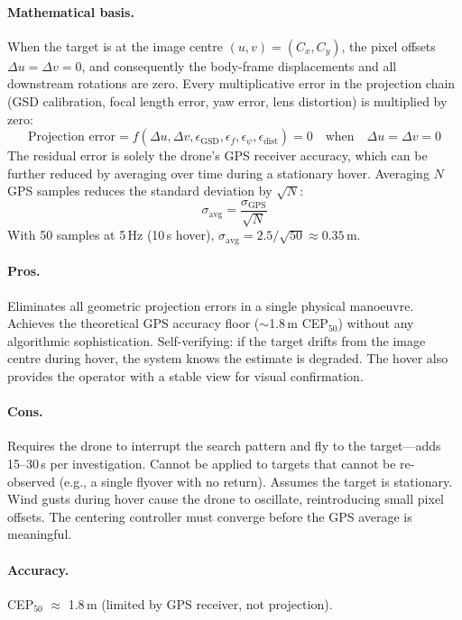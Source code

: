 \paragraph{Mathematical basis.}
When the target is at the image centre $(u, v) = (C_x, C_y)$, the pixel offsets $\Delta u = \Delta v = 0$, and consequently the body-frame displacements and all downstream rotations are zero.  Every multiplicative error in the projection chain (GSD calibration, focal length error, yaw error, lens distortion) is multiplied by zero:
\begin{equation}
  \text{Projection error} = f(\Delta u, \Delta v, \epsilon_\mathrm{GSD}, \epsilon_f, \epsilon_\psi, \epsilon_\mathrm{dist}) = 0 \quad \text{when} \quad \Delta u = \Delta v = 0
\end{equation}
The residual error is solely the drone's GPS receiver accuracy, which can be further reduced by averaging over time during a stationary hover.  Averaging $N$ GPS samples reduces the standard deviation by $\sqrt{N}$:
\begin{equation}
  \sigma_\mathrm{avg} = \frac{\sigma_\mathrm{GPS}}{\sqrt{N}}
\end{equation}
With 50 samples at 5\,Hz (10\,s hover), $\sigma_\mathrm{avg} = 2.5/\sqrt{50} \approx 0.35$\,m.

\paragraph{Pros.}
Eliminates all geometric projection errors in a single physical manoeuvre.  Achieves the theoretical GPS accuracy floor ($\sim$1.8\,m CEP$_{50}$) without any algorithmic sophistication.  Self-verifying: if the target drifts from the image centre during hover, the system knows the estimate is degraded.  The hover also provides the operator with a stable view for visual confirmation.

\paragraph{Cons.}
Requires the drone to interrupt the search pattern and fly to the target---adds 15--30\,s per investigation.  Cannot be applied to targets that cannot be re-observed (e.g., a single flyover with no return).  Assumes the target is stationary.  Wind gusts during hover cause the drone to oscillate, reintroducing small pixel offsets.  The centering controller must converge before the GPS average is meaningful.

\paragraph{Accuracy.}  CEP$_{50}$ $\approx$ 1.8\,m (limited by GPS receiver, not projection).

